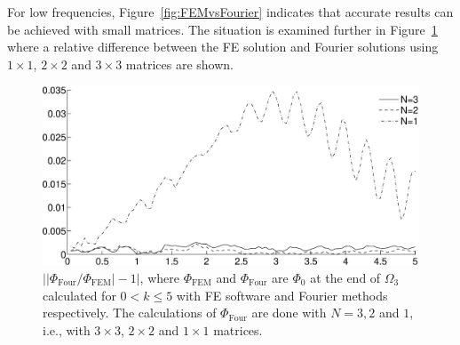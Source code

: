 \documentclass[numreferences]{kluwer}
\providecommand{\abs}[1]{\left\lvert#1\right\rvert}
\renewcommand{\Phi}{\varPhi}
\renewcommand{\Phi}{\varPhi}
\begin{document}


For low frequencies, Figure~\ref{fig:FEMvsFourier} indicates that
accurate results can be achieved with small matrices. The situation is
examined further in Figure~\ref{fig:relerr123} where a relative
difference between the FE solution and Fourier solutions using
$1\times1$, $2\times2$ and $3\times3$ matrices are shown.

\begin{figure}[htb]
  \centering
  \includegraphics[width=\linewidth]{relerr123}
  \caption{$\abs{\abs{\Phi_{\text{Four}}/\Phi_{\text{FEM}}}-1}$, where
    $\Phi_{\text{FEM}}$ and $\Phi_{\text{Four}}$ are $\Phi_0$ at the
    end of $\Omega_3$ calculated for $0<k\le5$ with FE software and
    Fourier methods respectively. The calculations of
    $\Phi_{\text{Four}}$ are done with $N=3,2$ and $1$, i.e., with
    $3\times3$, $2\times2$ and $1\times1$ matrices.}
  \label{fig:relerr123}
\end{figure}
\end{document}
